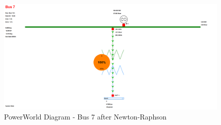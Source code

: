 \documentclass[12pt]{article}
\begin{document}
        \begin{figure}[H]
            \centerline{\includegraphics[scale=0.25]{images/PowerWorldBus7}}
            \caption{PowerWorld Diagram - Bus 7 after Newton-Raphson}
        \end{figure}
\end{document}
